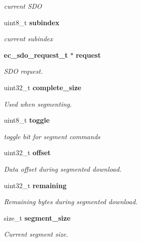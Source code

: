 \begin{DoxyCompactItemize}
\begin{DoxyCompactList}\small\item\em current \-S\-D\-O \end{DoxyCompactList}\item 
uint8\-\_\-t {\bf subindex}\label{structec__fsm__coe_aafeafb472a372377a5c4822823b831be}

\begin{DoxyCompactList}\small\item\em current subindex \end{DoxyCompactList}\item 
{\bf ec\-\_\-sdo\-\_\-request\-\_\-t} $\ast$ {\bf request}\label{structec__fsm__coe_a039da8218be486849bd275bf1f580e1e}

\begin{DoxyCompactList}\small\item\em \-S\-D\-O request. \end{DoxyCompactList}\item 
uint32\-\_\-t {\bf complete\-\_\-size}
\begin{DoxyCompactList}\small\item\em \-Used when segmenting. \end{DoxyCompactList}\item 
uint8\-\_\-t {\bf toggle}\label{structec__fsm__coe_aca395e10ef3f667a25fe05e70ce38d6b}

\begin{DoxyCompactList}\small\item\em toggle bit for segment commands \end{DoxyCompactList}\item 
uint32\-\_\-t {\bf offset}
\begin{DoxyCompactList}\small\item\em \-Data offset during segmented download. \end{DoxyCompactList}\item 
uint32\-\_\-t {\bf remaining}
\begin{DoxyCompactList}\small\item\em \-Remaining bytes during segmented download. \end{DoxyCompactList}\item 
size\-\_\-t {\bf segment\-\_\-size}
\begin{DoxyCompactList}\small\item\em \-Current segment size. \end{DoxyCompactList}\end{DoxyCompactItemize}



